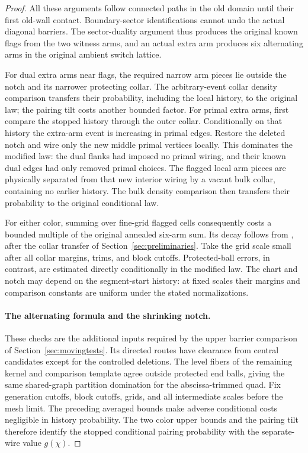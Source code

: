 \begin{proof}
All these arguments follow connected paths in the old domain until
their first old-wall contact.  Boundary-sector identifications cannot
undo the actual diagonal barriers.  The sector-duality argument thus
produces the original known flags from the two witness arms, and an
actual extra arm produces six alternating arms in the original
ambient switch lattice.

For dual extra arms near flags, the required narrow arm pieces lie
outside the notch and its narrower protecting collar.  The arbitrary-event
collar density comparison transfers their probability, including
the local history, to the original law; the pairing tilt costs another
bounded factor.  For primal extra arms, first compare the stopped
history through the outer collar.  Conditionally on that history the
extra-arm event is increasing in primal edges.  Restore the deleted
notch and wire only the new middle primal vertices locally.  This
dominates the modified law: the dual flanks had imposed no primal
wiring, and their known dual edges had only removed primal choices.
The flagged local arm pieces are physically separated from that new
interior wiring by a vacant bulk collar, containing no earlier history.
The bulk density comparison then transfers their probability to the
original conditional law.

For either color, summing over fine-grid flagged cells consequently
costs a bounded multiple of the original annealed six-arm sum.  Its
decay follows from \citet[Corollary~6.7]{DMT2021Fractal}, after the
collar transfer of Section~\ref{sec:preliminaries}.  Take the grid
scale small after all collar margins, trims, and block cutoffs.
Protected-ball errors, in contrast, are estimated directly
conditionally in the modified law.  The chart and notch may depend on
the segment-start history: at fixed scales their margins and comparison
constants are uniform under the stated normalizations.

\paragraph{The alternating formula and the shrinking notch.}
These checks are the additional inputs required by the upper barrier
comparison of Section~\ref{sec:movingtests}.  Its directed routes have
clearance from central candidates except for the controlled deletions.
The level fibers of the remaining kernel and comparison template agree
outside protected end balls, giving the same shared-graph partition
domination for the abscissa-trimmed quad.  Fix generation cutoffs,
block cutoffs, grids, and all intermediate scales before the mesh
limit.  The preceding averaged bounds make adverse conditional costs
negligible in history probability.  The two color upper bounds and the
pairing tilt therefore identify the stopped conditional pairing
probability with the separate-wire value $g(\chi)$.


\end{proof}
